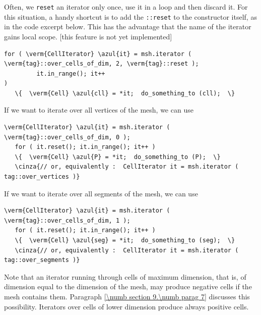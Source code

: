 Often, we {\small\tt reset} an iterator only once, use it in a loop and then discard it.
For this situation, a handy shortcut is to add the {\small\tt{}::reset}
to the constructor itself, as in the code excerpt below.
This has the advantage that the name of the iterator gains local scope.
[this feature is not yet implemented]

\begin{Verbatim}[commandchars=\\\{\},formatcom=\small\tt,
   baselinestretch=0.94,framesep=2mm                      ]
   for ( \verm{CellIterator} \azul{it} = msh.iterator ( \verm{tag}::over_cells_of_dim, 2, \verm{tag}::reset );
         it.in_range(); it++                                                       )
   \{  \verm{Cell} \azul{cll} = *it;  do_something_to (cll);  \}
\end{Verbatim}

If we want to iterate over all vertices of the mesh, we can use

\begin{Verbatim}[commandchars=\\\{\},formatcom=\small\tt,
   baselinestretch=0.94,framesep=2mm                      ]
   \verm{CellIterator} \azul{it} = msh.iterator ( \verm{tag}::over_cells_of_dim, 0 );
   for ( it.reset(); it.in_range(); it++ )
   \{  \verm{Cell} \azul{P} = *it;  do_something_to (P);  \}
   \cinza{// or, equivalently :  CellIterator it = msh.iterator ( tag::over_vertices )}
\end{Verbatim}

If we want to iterate over all segments of the mesh, we can use

\begin{Verbatim}[commandchars=\\\{\},formatcom=\small\tt,
   baselinestretch=0.94,framesep=2mm                      ]
   \verm{CellIterator} \azul{it} = msh.iterator ( \verm{tag}::over_cells_of_dim, 1 );
   for ( it.reset(); it.in_range(); it++ )
   \{  \verm{Cell} \azul{seg} = *it;  do_something_to (seg);  \}
   \cinza{// or, equivalently :  CellIterator it = msh.iterator ( tag::over_segments )}
\end{Verbatim}

Note that an iterator running through cells of maximum dimension, that is, of dimension equal
to the dimension of the mesh, may produce negative cells if the mesh contains them.
Paragraph \ref{\numb section 9.\numb parag 7} discusses this possibility.
Iterators over cells of lower dimension produce always positive cells.


